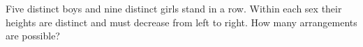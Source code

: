 Five distinct boys and nine distinct girls stand in a row. Within each sex their heights are distinct and must decrease from left to right. How many arrangements are possible?
